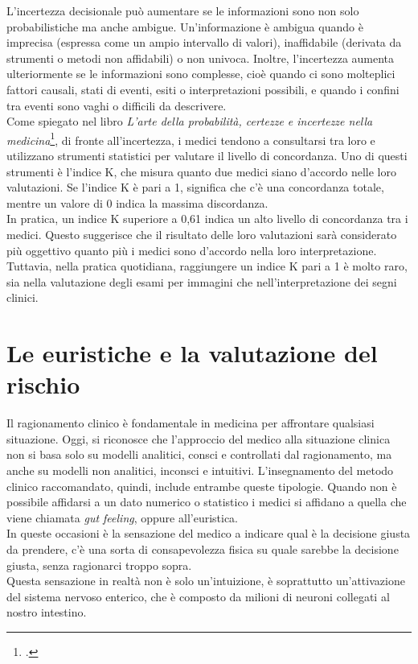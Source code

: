 L'incertezza decisionale può aumentare se le informazioni sono non solo probabilistiche ma anche ambigue. Un'informazione è ambigua quando è imprecisa (espressa come un ampio intervallo di valori), inaffidabile (derivata da strumenti o metodi non affidabili) o non univoca. Inoltre, l'incertezza aumenta ulteriormente se le informazioni sono complesse, cioè quando ci sono molteplici fattori causali, stati di eventi, esiti o interpretazioni possibili, e quando i confini tra eventi sono vaghi o difficili da descrivere.\\

Come spiegato nel libro \textit{L'arte della probabilità, certezze e incertezze nella medicina}\footcite{womak:arte-probabilita-coen}, di fronte all'incertezza, i medici tendono a consultarsi tra loro e utilizzano strumenti statistici per valutare il livello di concordanza. Uno di questi strumenti è l'indice K, che misura quanto due medici siano d'accordo nelle loro valutazioni. Se l'indice K è pari a 1, significa che c'è una concordanza totale, mentre un valore di 0 indica la massima discordanza. \\
In pratica, un indice K superiore a 0,61 indica un alto livello di concordanza tra i medici. Questo suggerisce che il risultato delle loro valutazioni sarà considerato più oggettivo quanto più i medici sono d'accordo nella loro interpretazione. Tuttavia, nella pratica quotidiana, raggiungere un indice K pari a 1 è molto raro, sia nella valutazione degli esami per immagini che nell'interpretazione dei segni clinici.

\section{Le euristiche e la valutazione del rischio}

Il ragionamento clinico è fondamentale in medicina per affrontare qualsiasi situazione. Oggi, si riconosce che l'approccio del medico alla situazione clinica non si basa solo su modelli analitici, consci e controllati dal ragionamento, ma anche su modelli non analitici, inconsci e intuitivi. L'insegnamento del metodo clinico raccomandato, quindi, include entrambe queste tipologie. Quando non è possibile affidarsi a un dato numerico o statistico i medici si affidano a quella che viene chiamata \textit{gut feeling}, oppure all'euristica.\\
In queste occasioni è la sensazione del medico a indicare qual è la decisione giusta da prendere, c'è una sorta di consapevolezza fisica su quale sarebbe la decisione giusta, senza ragionarci troppo sopra.\\
Questa sensazione in realtà non è solo un'intuizione, è soprattutto un'attivazione del sistema nervoso enterico, che è composto da milioni di neuroni collegati al nostro intestino. \\

